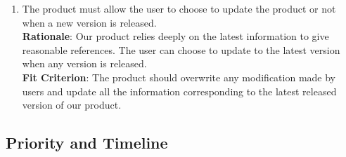 \documentclass{article}
\begin{document}
\begin{enumerate}[FR1]
	\item The product must allow the user to choose to update the product or not when a new version is released.\\
	\textbf{Rationale}: Our product relies deeply on the latest information to give reasonable references. The user can choose to update to the latest version when any version is released.\\
	\textbf{Fit Criterion}: The product should overwrite any modification made by users and update all the information corresponding to the latest released version of our product.
\end{enumerate}

\subsection{Priority and Timeline}
\end{document}
